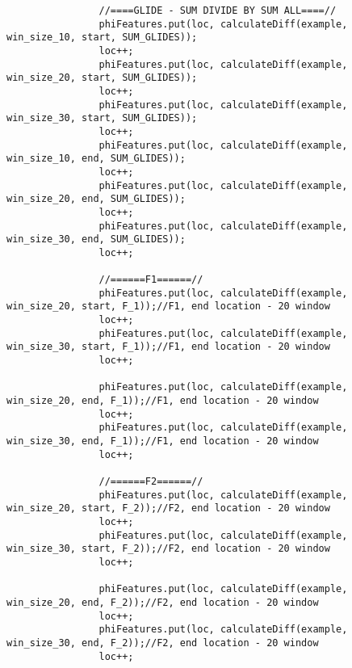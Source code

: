 \documentclass[11pt, oneside]{article}   	%
\begin{document}
\begin{lstlisting}
                //====GLIDE - SUM DIVIDE BY SUM ALL====//
                phiFeatures.put(loc, calculateDiff(example, win_size_10, start, SUM_GLIDES));
                loc++;
                phiFeatures.put(loc, calculateDiff(example, win_size_20, start, SUM_GLIDES));
                loc++;
                phiFeatures.put(loc, calculateDiff(example, win_size_30, start, SUM_GLIDES));
                loc++;
                phiFeatures.put(loc, calculateDiff(example, win_size_10, end, SUM_GLIDES));
                loc++;
                phiFeatures.put(loc, calculateDiff(example, win_size_20, end, SUM_GLIDES));
                loc++;
                phiFeatures.put(loc, calculateDiff(example, win_size_30, end, SUM_GLIDES));
                loc++;

                //======F1======//
                phiFeatures.put(loc, calculateDiff(example, win_size_20, start, F_1));//F1, end location - 20 window
                loc++;
                phiFeatures.put(loc, calculateDiff(example, win_size_30, start, F_1));//F1, end location - 20 window
                loc++;

                phiFeatures.put(loc, calculateDiff(example, win_size_20, end, F_1));//F1, end location - 20 window
                loc++;
                phiFeatures.put(loc, calculateDiff(example, win_size_30, end, F_1));//F1, end location - 20 window
                loc++;

                //======F2======//
                phiFeatures.put(loc, calculateDiff(example, win_size_20, start, F_2));//F2, end location - 20 window
                loc++;
                phiFeatures.put(loc, calculateDiff(example, win_size_30, start, F_2));//F2, end location - 20 window
                loc++;

                phiFeatures.put(loc, calculateDiff(example, win_size_20, end, F_2));//F2, end location - 20 window
                loc++;
                phiFeatures.put(loc, calculateDiff(example, win_size_30, end, F_2));//F2, end location - 20 window
                loc++;


\end{lstlisting}
\end{document}
